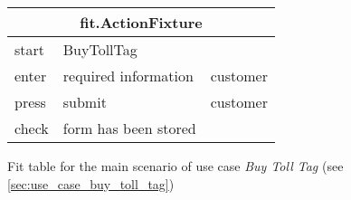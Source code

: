 
\begin{figure}[H]
\centering
\begin{tabular}{|l|l|l|}
\hline 
\multicolumn{3}{|c|}{fit.ActionFixture}\tabularnewline
\hline 
start & BuyTollTag & \tabularnewline
\hline 
enter & required information & customer\tabularnewline
\hline 
press & submit & customer \tabularnewline
\hline 
check & form has been stored & \tabularnewline
\hline 
\end{tabular}
\caption{Fit table for the main scenario of use case \emph{Buy Toll Tag} (see \autoref{sec:use_case_buy_toll_tag})}
\end{figure}
